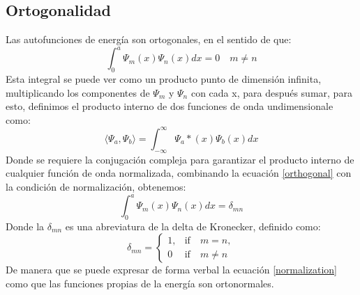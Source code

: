 \documentclass[12pt,twoside]{extarticle}
\begin{document}
\subsection{Ortogonalidad}
Las autofunciones de energía son ortogonales, en el sentido de que:
\begin{equation}
    \int_{0}^{a} \Psi_m(x)\Psi_n(x)dx=0 \quad m\neq n \label{orthogonal}
\end{equation}
Esta integral se puede ver como un producto punto de dimensión infinita, multiplicando los componentes de $\Psi_m$ y $\Psi_n$ con cada x, para después sumar, para esto, definimos el producto interno de dos funciones de onda undimensionale como:
\begin{equation}
    \langle \Psi_a, \Psi_b \rangle=\int_{-\infty}^{\infty} \Psi_a*(x)\Psi_b(x)dx
\end{equation}
Donde se requiere la conjugación compleja para garantizar el producto interno de cualquier función de onda normalizada, combinando la ecuación \ref{orthogonal} con la condición de normalización, obtenemos:
\begin{equation}
    \int_{0}^{a} \Psi_m(x)\Psi_n(x)dx=\delta_{mn} \label{normalization}
\end{equation}
Donde la $\delta_{mn}$ es una abreviatura de la delta de Kronecker, definido como:
\begin{equation}
    \delta_{mn}=\begin{cases}
1, & \text{if}\quad m=n, \\ 0 & \text{if}\quad m\neq n\end{cases}
\end{equation}
De manera que se puede expresar de forma verbal la ecuación \ref{normalization} como que las funciones propias de la energía son ortonormales.
\end{document}
